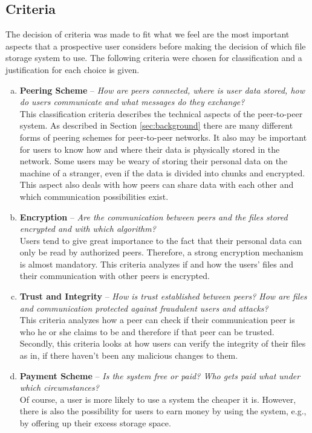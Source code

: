 \subsection{Criteria}
The decision of criteria was made to fit what we feel are the most important aspects that a prospective user considers before making the decision of which file storage system to use. The following criteria were chosen for classification and a justification for each choice is given.

\begin{enumerate}[(a)]
\item \textbf{Peering Scheme} -- \textit{How are peers connected, where is user data stored, how do users communicate and what messages do they exchange?}\\
This classification criteria describes the technical aspects of the peer-to-peer system. As described in Section \ref{sec:background} there are many different forms of peering schemes for peer-to-peer networks. It also may be important for users to know how and where their data is physically stored in the network. Some users may be weary of storing their personal data on the machine of a stranger, even if the data is divided into chunks and encrypted. This aspect also deals with how peers can share data with each other and which communication possibilities exist. 

\item \textbf{Encryption} -- \textit{Are the communication between peers and the files stored encrypted and with which algorithm?}\\
Users tend to give great importance to the fact that their personal data can only be read by authorized peers. Therefore, a strong encryption mechanism is almost mandatory. This criteria analyzes if and how the users' files and their communication with other peers is encrypted.

\item \textbf{Trust and Integrity} -- \textit{How is trust established between peers? How are files and communication protected against fraudulent users and attacks?}\\
This criteria analyzes how a peer can check if their communication peer is who he or she claims to be and therefore if that peer can be trusted. Secondly, this criteria looks at how users can verify the integrity of their files as in, if there haven't been any malicious changes to them.

\item \textbf{Payment Scheme} -- \textit{Is the system free or paid? Who gets paid what under which circumstances?}\\
Of course, a user is more likely to use a system the cheaper it is. However, there is also the possibility for users to earn money by using the system, e.g., by offering up their excess storage space.


\end{enumerate}
